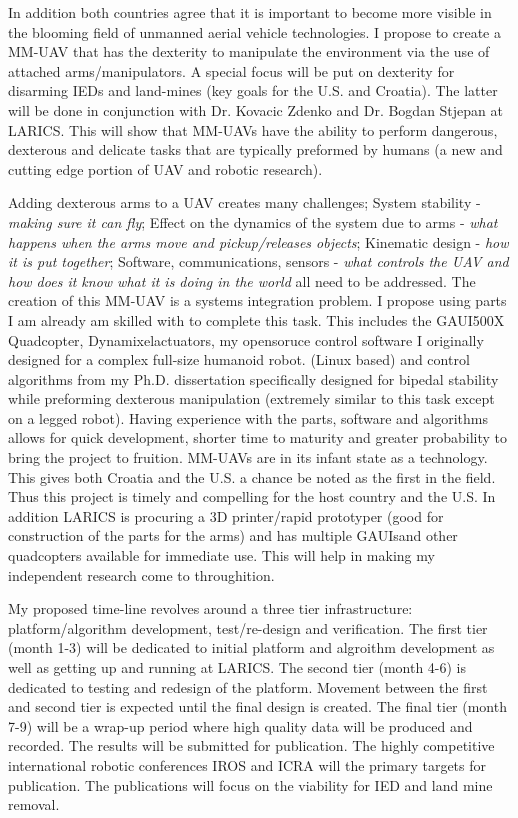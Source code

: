 \documentclass[12pt]{article}
\begin{document}
In addition both countries agree that it is important to become more visible in the blooming field of unmanned aerial vehicle technologies.
I propose to create a MM-UAV that has the dexterity to manipulate the environment via the use of attached  arms/manipulators. 
A special focus will be put on dexterity for disarming IEDs and land-mines (key goals for the U.S. and Croatia).  
The latter will be done in conjunction with Dr. Kovacic Zdenko and Dr. Bogdan Stjepan at LARICS.  
This will show that MM-UAVs have the ability to perform dangerous, dexterous and delicate tasks that are typically preformed by humans (a new and cutting edge portion of UAV and robotic research).

Adding dexterous arms to a UAV creates many challenges; 
System stability -  \textit{making sure it can fly};
Effect on the dynamics of the system due to arms - \textit{what happens when the arms move and pickup/releases objects};
Kinematic design -  \textit{how it is put together};
Software, communications, sensors -  \textit{what controls the UAV and how does it know what it is doing in the world} all need to be addressed.  
The creation of this MM-UAV is a systems integration problem.  
I propose using parts I am already am skilled with to complete this task.
This includes the GAUI\texttrademark 500X Quadcopter, Dynamixel\texttrademark actuators, my opensoruce control software I originally designed for a complex full-size humanoid robot.
(Linux based) and control algorithms from my Ph.D. dissertation specifically designed for bipedal stability while preforming dexterous manipulation (extremely similar to this task except on a legged robot).  
Having experience with the parts, software and algorithms allows for quick development, shorter time to maturity and greater probability to bring the project to fruition.  
MM-UAVs are in its infant state as a technology.
This gives both Croatia and the U.S. a chance be noted as the first in the field.
Thus this project is timely and compelling for the host country and the U.S.  
In addition LARICS is procuring a 3D printer/rapid prototyper (good for construction of the parts for the arms) and has multiple GAUIs\texttrademark and other quadcopters available for immediate use.  This will help in making my independent research come to throughition.

My proposed time-line revolves around a three tier infrastructure: platform/algorithm development, test/re-design and verification.  
The first tier (month 1-3) will be dedicated to initial platform and algroithm development as well as getting up and running at LARICS.  
The second tier (month 4-6) is dedicated to testing and redesign of the platform.  
Movement between the first and second tier is expected until the final design is created.
The final tier (month 7-9) will be a wrap-up period where high quality data will be produced and recorded.
The results will be submitted for publication.  
The highly competitive international robotic conferences IROS and ICRA will the primary targets for publication.  
The publications will focus on the viability for IED and land mine removal.
\end{document}
